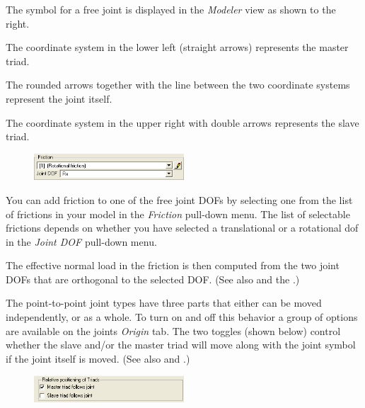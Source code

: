 The symbol for a free joint is displayed in the {\sl Modeler} view
as shown to the right.

\begin{bulletlist}
\item
  The coordinate system in the lower left (straight arrows) represents
  the master triad.
\item
  The rounded arrows together with the line between the two coordinate
  systems represent the joint itself.
\item
  The coordinate system in the upper right with double arrows represents
  the slave triad.
\end{bulletlist}

\begin{figure}
  \vspace{-3mm}
  \includegraphics[width=0.5\textwidth]{Figures/4-FrictionDOF}
\end{figure}

You can add friction to one of the free joint DOFs by selecting one from
the list of frictions in your model in the {\sl Friction} pull-down menu.
The list of selectable frictions depends on whether you have selected
a translational or a rotational dof in the {\sl Joint DOF} pull-down menu.

The effective normal load in the friction is then computed from the two
joint DOFs that are orthogonal to the selected DOF.
(See also 
and the .)



The point-to-point joint types have three parts that either can be moved
independently, or as a whole. To turn on and off this behavior a group
of options are available on the joints {\sl Origin} tab. The two
toggles (shown below) control whether the slave and/or the master triad
will move along with the joint symbol if the joint itself is moved. (See
also  and
.)

\begin{figure}[!h]
\center
\includegraphics[width=0.5\textwidth]{Figures/4-RelativePositioningOfTriads}
\end{figure}

